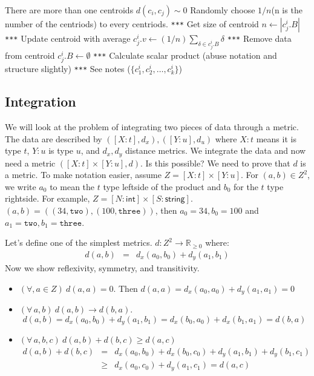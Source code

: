 \documentclass{article}
\begin{document}
\begin{enumerate}
\begin{itemize}
{\begin{center}
\begin{algorithmic}[1]
			\If  There are more than one centroids $d(c_i, c_j) \sim 0$
			\State Randomly choose $1/n$(n is the number of the centriods) to every centriods.
			\EndIf
			\State \texttt{***} Get size of centroid
			\State $n \gets |c_j^i.B|$
			\State \texttt{***} Update centroid with average 
			\State $c_j^i.v \gets (1/n)\sum_{\delta \in c_j^i.B} \delta$
			\State \texttt{***} Remove data from centroid
			\State $c_j^i.B \gets \emptyset$
			\EndFor
			\State \texttt{***} Calculate scalar product (abuse notation and structure slightly)
			\State \texttt{***} See notes
			 ($\{c_1^i, c_2^i, \ldots, c_k^i\}$) 
			\end{algorithmic}
	\end{center}}
\end{itemize}
\end{enumerate}

\subsection*{Integration}
We will look at the problem of integrating two pieces of data through a metric.  The data are described by $([X:t], d_x), ([Y:u], d_u)$ where $X:t$ means it is type $t$,  $Y:u$ is type $u$, and $d_x,d_y$ distance metrics.  We integrate the data and now need a metric $([X:t]\times [Y:u], d)$.  Is this possible?  We need to prove  that $d$ is a metric.  To make notation easier, assume $Z = [X:t]\times [Y:u]$.  For $(a,b) \in Z^2$, we write $a_0$ to mean the $t$ type leftside of the product and $b_0$ for the $t$ type rightside.  For example, $Z = [N : \textsf{int}] \times [S : \textsf{string}]$.  $(a,b) = ((34, \texttt{two}), (100, \texttt{three}))$, then $a_0 = 34, b_0 = 100$ and $a_1 = \texttt{two}, b_1 = \texttt{three}$.

Let's define one of the simplest metrics.
$d:Z^2 \rightarrow \mathbb{R}_{\geq 0}$ where:
\begin{eqnarray*}
d(a,b) &=& d_x(a_0,b_0) + d_y(a_1,b_1)
\end{eqnarray*}
Now we show reflexivity, symmetry, and transitivity.  
\begin{itemize}
\item $(\forall, a \in Z)\ d(a,a) = 0$.  Then $d(a,a) = d_x(a_0,a_0) + d_y(a_1,a_1) = 0$  
\item $(\forall\, a, b)\ d(a,b) \rightarrow d(b,a)$.    
\[ d(a,b) = d_x(a_0,b_0) + d_y(a_1,b_1) = d_x(b_0,a_0) + d_x(b_1,a_1) = d(b,a) \]
\item $(\forall\, a,b,c)\ d(a,b) + d(b,c) \geq d(a,c)$
\begin{eqnarray*}
d(a,b) + d(b,c) &=& d_x(a_0,b_0) + d_x(b_0,c_0) + d_y(a_1,b_1) + d_y(b_1,c_1)\\
&\geq& d_x(a_0,c_0) + d_y(a_1,c_1) = d(a,c)\\
\end{eqnarray*}
\end{itemize} 
\end{document}
